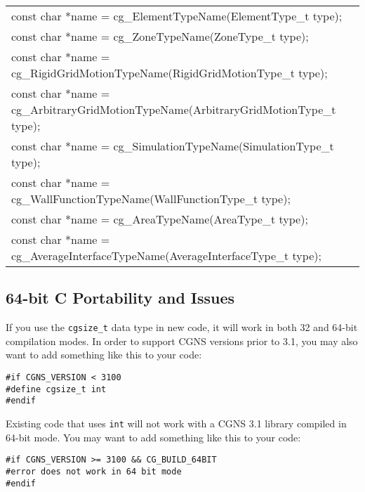 \begin{table}
\begin{center}
\begin{tabular}{l}
\textcolor{output}{const char *name} = cg\_ElementTypeName(\textcolor{input}{ElementType\_t type}); \\
\textcolor{output}{const char *name} = cg\_ZoneTypeName(\textcolor{input}{ZoneType\_t type}); \\
\textcolor{output}{const char *name} = cg\_RigidGridMotionTypeName(\textcolor{input}{RigidGridMotionType\_t type}); \\
\textcolor{output}{const char *name} = cg\_ArbitraryGridMotionTypeName(\textcolor{input}{ArbitraryGridMotionType\_t type}); \\
\textcolor{output}{const char *name} = cg\_SimulationTypeName(\textcolor{input}{SimulationType\_t type}); \\
\textcolor{output}{const char *name} = cg\_WallFunctionTypeName(\textcolor{input}{WallFunctionType\_t type}); \\
\textcolor{output}{const char *name} = cg\_AreaTypeName(\textcolor{input}{AreaType\_t type}); \\
\textcolor{output}{const char *name} = cg\_AverageInterfaceTypeName(\textcolor{input}{AverageInterfaceType\_t type}); \\
\hline
\end{tabular}
\end{center}
\end{table}
 
\clearpage

\subsection{64-bit C Portability and Issues}

If you use the \texttt{cgsize\_t} data type in new code,
it will work in both 32 and 64-bit compilation modes.
In order to support CGNS versions prior to 3.1, you may also
want to add something like this to your code:

\noindent \texttt{\#if CGNS\_VERSION < 3100}  \\
\noindent \texttt{\#define cgsize\_t int}  \\
\noindent \texttt{\#endif}

Existing code that uses \texttt{int} will not work with a
CGNS 3.1 library compiled in 64-bit mode. You may want
to add something like this to your code:

\noindent \texttt{\#if CGNS\_VERSION >= 3100 \&\& CG\_BUILD\_64BIT} \\
\noindent \texttt{\#error does not work in 64 bit mode} \\
\noindent \texttt{\#endif}

